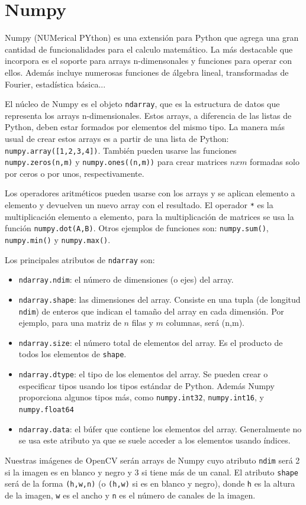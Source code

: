 \documentclass[a4paper,openright, 12pt]{book}
\begin{document}
\section{Numpy} \label{sec.numpy}
Numpy (NUMerical PYthon) es una extensión para Python que agrega una gran cantidad de funcionalidades para el calculo matemático. La más destacable que incorpora es el soporte para arrays n-dimensonales y funciones para operar con ellos. Además incluye numerosas funciones de álgebra lineal, transformadas de Fourier, estadística básica...

El núcleo de Numpy es el objeto \lstinline|ndarray|, que es la estructura de datos que representa los arrays n-dimensionales. Estos arrays, a diferencia de las listas de Python, deben estar formados por elementos del mismo tipo.
La manera más usual de crear estos arrays es a partir de una lista de Python: \lstinline|numpy.array([1,2,3,4])|. También pueden usarse las funciones \lstinline|numpy.zeros(n,m)| y \lstinline|numpy.ones((n,m))| para crear matrices $nxm$ formadas solo por ceros o por unos, respectivamente.

Los operadores aritméticos pueden usarse con los arrays y se aplican elemento a elemento y devuelven un nuevo array con el resultado.
El operador \lstinline|*| es la multiplicación elemento a elemento, para la multiplicación de matrices se usa la función \lstinline|numpy.dot(A,B)|.
Otros ejemplos de funciones son: \lstinline|numpy.sum()|, \lstinline|numpy.min()| y \lstinline|numpy.max()|.

Los principales atributos de \lstinline|ndarray| son:
 \begin{itemize}
\item \lstinline|ndarray.ndim|: el número de dimensiones (o ejes) del array.
 
\item \lstinline|ndarray.shape|: las dimensiones del array. Consiste en una tupla (de longitud \lstinline|ndim|) de enteros que indican el tamaño del array en cada dimensión. Por ejemplo, para una matriz de $n$ filas y $m$ columnas, será (n,m).

\item  \lstinline|ndarray.size|: el número total de elementos del array. Es el producto de todos los elementos de \lstinline|shape|. 

\item\lstinline|ndarray.dtype|: el tipo de los elementos del array. Se pueden crear o especificar tipos usando los tipos estándar de Python. Además Numpy proporciona algunos tipos más, como \lstinline|numpy.int32|, \lstinline|numpy.int16|, y \lstinline|numpy.float64|

\item \lstinline|ndarray.data|: el búfer que contiene los elementos del array. Generalmente no se usa este atributo ya que se suele acceder a los elementos usando índices.
 \end{itemize}
Nuestras imágenes de OpenCV serán arrays de Numpy cuyo atributo \lstinline|ndim| será 2 si la imagen es en blanco y negro y 3 si tiene más de un canal.
El atributo \lstinline|shape| será de la forma \lstinline|(h,w,n)| (o \lstinline|(h,w)| si es en blanco y negro), donde \lstinline|h| es la altura de la imagen, \lstinline|w| es el ancho y \lstinline|n| es el número de canales de la imagen.
\end{document}
